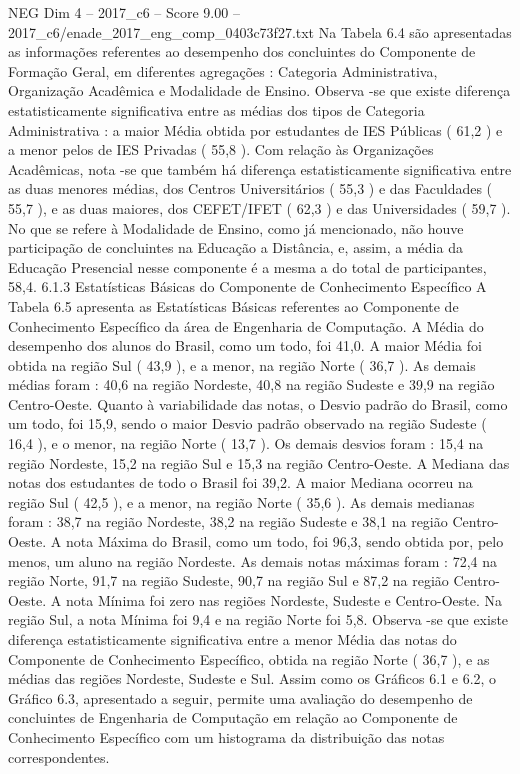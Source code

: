 \begin{textsample}{NEG Dim 4 – 2017\_c6 – Score 9.00 – 2017\_c6/enade\_2017\_eng\_comp\_0403c73f27.txt}
Na Tabela 6.4 são apresentadas as informações referentes ao desempenho dos concluintes do Componente de Formação Geral, em diferentes agregações : Categoria Administrativa, Organização Acadêmica e Modalidade de Ensino.
Observa -se que existe diferença estatisticamente significativa entre as médias dos tipos de Categoria Administrativa : a maior Média obtida por estudantes de IES Públicas ( 61,2 ) e a menor pelos de IES Privadas ( 55,8 ).
Com relação às Organizações Acadêmicas, nota -se que também há diferença estatisticamente significativa entre as duas menores médias, dos Centros Universitários ( 55,3 ) e das Faculdades ( 55,7 ), e as duas maiores, dos CEFET/IFET ( 62,3 ) e das Universidades ( 59,7 ).
No que se refere à Modalidade de Ensino, como já mencionado, não houve participação de concluintes na Educação a Distância, e, assim, a média da Educação Presencial nesse componente é a mesma a do total de participantes, 58,4. 6.1.3 Estatísticas Básicas do Componente de Conhecimento Específico A Tabela 6.5 apresenta as Estatísticas Básicas referentes ao Componente de Conhecimento Específico da área de Engenharia de Computação.
A Média do desempenho dos alunos do Brasil, como um todo, foi 41,0.
A maior Média foi obtida na região Sul ( 43,9 ), e a menor, na região Norte ( 36,7 ).
As demais médias foram : 40,6 na região Nordeste, 40,8 na região Sudeste e 39,9 na região Centro-Oeste.
Quanto à variabilidade das notas, o Desvio padrão do Brasil, como um todo, foi 15,9, sendo o maior Desvio padrão observado na região Sudeste ( 16,4 ), e o menor, na região Norte ( 13,7 ).
Os demais desvios foram : 15,4 na região Nordeste, 15,2 na região Sul e 15,3 na região Centro-Oeste.
A Mediana das notas dos estudantes de todo o Brasil foi 39,2.
A maior Mediana ocorreu na região Sul ( 42,5 ), e a menor, na região Norte ( 35,6 ).
As demais medianas foram : 38,7 na região Nordeste, 38,2 na região Sudeste e 38,1 na região Centro-Oeste.
A nota Máxima do Brasil, como um todo, foi 96,3, sendo obtida por, pelo menos, um aluno na região Nordeste.
As demais notas máximas foram : 72,4 na região Norte, 91,7 na região Sudeste, 90,7 na região Sul e 87,2 na região Centro-Oeste.
A nota Mínima foi zero nas regiões Nordeste, Sudeste e Centro-Oeste.
Na região Sul, a nota Mínima foi 9,4 e na região Norte foi 5,8.
Observa -se que existe diferença estatisticamente significativa entre a menor Média das notas do Componente de Conhecimento Específico, obtida na região Norte ( 36,7 ), e as médias das regiões Nordeste, Sudeste e Sul.
Assim como os Gráficos 6.1 e 6.2, o Gráfico 6.3, apresentado a seguir, permite uma avaliação do desempenho de concluintes de Engenharia de Computação em relação ao Componente de Conhecimento Específico com um histograma da distribuição das notas correspondentes.

\end{textsample}
